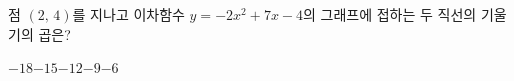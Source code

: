 점 $(2,\,4)$를 지나고 이차함수 $y=-2x^2+7x-4$의 그래프에 접하는 두 직선의 기울기의 곱은?
\begin{choices32}{$-18$}{$-15$}{$-12$}{$-9$}{$-6$}\end{choices32}

